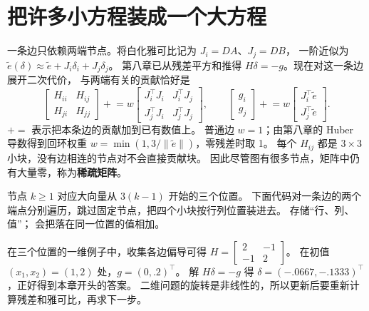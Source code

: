 \section{把许多小方程装成一个大方程}
一条边只依赖两端节点。将白化雅可比记为 $J_i=DA$、$J_j=DB$，
一阶近似为 $\widetilde e(\delta)\approx\widetilde e+J_i\delta_i+J_j\delta_j$。
第八章已从残差平方和推得 $H\delta=-g$。现在对这一条边展开二次代价，
与两端有关的贡献恰好是
\begin{equation}
\begin{bmatrix}H_{ii}&H_{ij}\\H_{ji}&H_{jj}\end{bmatrix}
\mathrel{+}=w\begin{bmatrix}J_i^\top J_i&J_i^\top J_j\\
J_j^\top J_i&J_j^\top J_j\end{bmatrix},\qquad
\begin{bmatrix}g_i\\g_j\end{bmatrix}\mathrel{+}=w\begin{bmatrix}J_i^\top\widetilde e\\J_j^\top\widetilde e\end{bmatrix}.
\end{equation}
$\mathrel{+}=$ 表示把本条边的贡献加到已有数值上。
普通边 $w=1$；由第八章的 Huber 导数得到回环权重
$w=\min(1,3/\|\widetilde e\|)$，零残差时取 1。
每个 $H_{ij}$ 都是 $3\times3$ 小块，没有边相连的节点对不会直接贡献块。
因此尽管图有很多节点，矩阵中仍有大量零，称为\textbf{稀疏矩阵}。

节点 $k\geq1$ 对应大向量从 $3(k-1)$ 开始的三个位置。
下面代码对一条边的两个端点分别遍历，跳过固定节点，把四个小块按行列位置装进去。
 存储“行、列、值”； 会把落在同一位置的值相加。

\par\noindent\begin{minipage}{\linewidth}

\end{minipage}\par

在三个位置的一维例子中，收集各边偏导可得
$H=\left[\begin{smallmatrix}2&-1\\-1&2\end{smallmatrix}\right]$。
在初值 $(x_1,x_2)=(1,2)$ 处，$g=(0,.2)^\top$。
解 $H\delta=-g$ 得 $\delta=(-.0667,-.1333)^\top$，正好得到本章开头的答案。
二维问题的旋转是非线性的，所以更新后要重新计算残差和雅可比，再求下一步。

